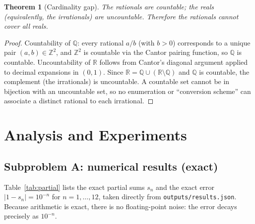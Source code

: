 \documentclass[11pt,a4paper]{article}
\newtheorem{theorem}{Theorem}
\begin{document}
\begin{theorem}[Cardinality gap]
  The rationals are countable; the reals (equivalently, the irrationals) are
  uncountable. Therefore the rationals cannot cover all reals.
\end{theorem}

\begin{proof}
Countability of $\mathbb Q$: every rational $a/b$ (with $b>0$) corresponds to a
unique pair $(a,b)\in\mathbb Z^2$, and $\mathbb Z^2$ is countable via the
Cantor pairing function, so $\mathbb Q$ is countable. Uncountability of
$\mathbb R$ follows from Cantor's diagonal argument applied to decimal
expansions in $(0,1)$. Since $\mathbb R=\mathbb Q\cup(\mathbb R\setminus\mathbb Q)$
and $\mathbb Q$ is countable, the complement (the irrationals) is uncountable.
A countable set cannot be in bijection with an uncountable set, so no
enumeration or ``conversion scheme'' can associate a distinct rational to each
irrational.
\end{proof}


\section{Analysis and Experiments}
\label{sec:analysis}

\subsection{Subproblem A: numerical results (exact)}
Table~\ref{tab:partial} lists the exact partial sums $s_n$ and the exact error
$|1-s_n|=10^{-n}$ for $n=1,\dots,12$, taken directly from
\texttt{outputs/results.json}. Because arithmetic is exact, there is no
floating-point noise: the error decays precisely as $10^{-n}$.
\end{document}
